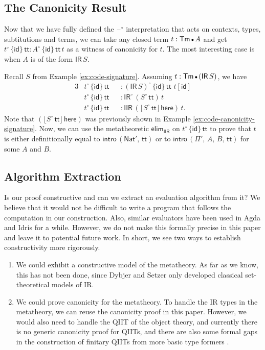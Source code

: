 \documentclass[acmsmall,screen,review]{acmart}
\newcommand{\msf}[1]{{\mathsf{#1}}}
\newcommand{\Nat}{\msf{Nat}}
\newcommand{\ttt}{\msf{tt}}
\newcommand{\blank}{{\mathord{\hspace{1pt}\text{--}\hspace{1pt}}}}
\newcommand{\IR}{\msf{IR}}
\newcommand{\intro}{\msf{intro}}
\newcommand{\elim}{\msf{elim}}
\newcommand{\IIR}{\msf{IIR}}
\newcommand{\floord}[1]{\lfloor #1 \rfloor}
\newcommand{\emptycon}{\scaleobj{.75}\bullet}
\newcommand{\id}{\msf{id}}
\newcommand{\Tm}{\msf{Tm}}
\newcommand{\w}{\circ}
\newcommand{\here}{\msf{here}}
\begin{document}
\subsection{The Canonicity Result}

Now that we have fully defined the $\blank^\w$ interpretation that acts on contexts, types,
subtitutions and terms, we can take any closed term $t : \Tm\,\emptycon\,A$ and get
$t^\w\,\{\id\}\,\ttt : A^\w\,\{\id\}\,\ttt\,t$ as a witness of canonicity for $t$. The most
interesting case is when $A$ is of the form $\IR\,S$.
\begin{example}
Recall $S$ from Example \ref{ex:code-signature}. Assuming $t : \Tm\,\emptycon\,(\IR\,S)$, we have
\begin{alignat*}{3}
  &t^\w\,\{\id\}\,\ttt &&: (\IR\,S)^\w\,\{\id\}\,\ttt\,\,t[\id]\\
  &t^\w\,\{\id\}\,\ttt &&: \IR^\w\,(S^\w\,\ttt)\,t\\
  &t^\w\,\{\id\}\,\ttt &&: \IIR\,(\floord{S^\w\,\ttt}\,\here)\,t.
\end{alignat*}
Note that $(\floord{S^\w\,\ttt}\,\here)$ was previously shown in Example
\ref{ex:code-canonicity-signature}. Now, we can use the metatheoretic $\elim_{\IIR}$ on
$t^\w\,\{\id\}\,\ttt$ to prove that $t$ is either definitionally equal to $\intro\,(\Nat',\,\ttt)$
or to $\intro\,(\Pi',\,A,\,B,\,\ttt)$ for some $A$ and $B$.
\end{example}

\subsection{Algorithm Extraction}

Is our proof constructive and can we extract an evaluation algorithm from it?  We believe that it
would not be difficult to write a program that follows the computation in our construction.  Also,
similar evaluators have been used in Agda and Idris for a while. However, we do not make this
formally precise in this paper and leave it to potential future work. In short, we see two ways to
establish constructivity more rigorously.
\begin{enumerate}
\item We could exhibit a constructive model of the metatheory. As far as we know, this has not been
  done, since Dybjer and Setzer only developed classical set-theoretical models of IR.
\item We could prove canonicity for the metatheory. To handle the IR types in the metatheory, we can
  reuse the canonicity proof in this paper. However, we would also need to handle the QIIT of the
  object theory, and currently there is no generic canonicity proof for QIITs, and there are also
  some formal gaps in the construction of finitary QIITs from more basic type formers
  \cite{DBLP:journals/corr/abs-2302-08837}.
\end{enumerate}
\end{document}
